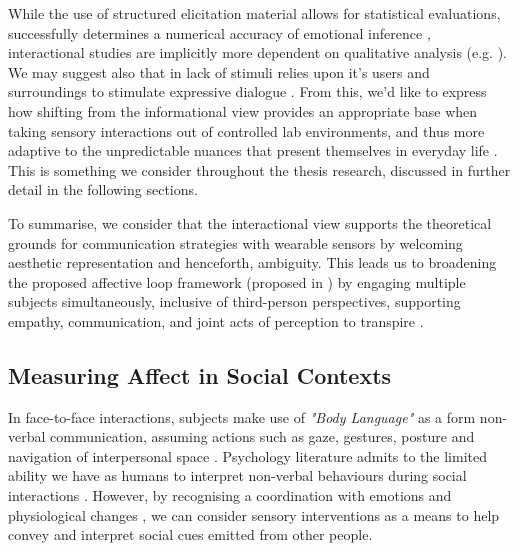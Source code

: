 While the use of structured elicitation material allows for statistical evaluations, successfully determines a numerical accuracy of emotional inference \cite{bota_review_2019}, interactional studies are implicitly more dependent on qualitative analysis (e.g. \cite{hook_embracing_2018,howell_life-affirming_2019}). We may suggest also that in lack of stimuli relies upon it’s users and surroundings to stimulate expressive dialogue \cite{gonzalez_dance-inspired_2012}. From this, we'd like to express how shifting from the informational view provides an appropriate base when taking sensory interactions out of controlled lab environments, and thus more adaptive to the unpredictable nuances that present themselves in everyday life \cite{brown_into_2011,stjerna_aspects_2013,maki-petaja_aesthetic_2014}. This is something we consider throughout the thesis research, discussed in further detail in the following sections.


To summarise, we consider that the interactional view supports the theoretical grounds for communication strategies with wearable sensors by welcoming aesthetic representation and henceforth, ambiguity. This leads us to broadening the proposed affective loop framework (proposed in \cite{hook_affective_2009}) by engaging multiple subjects simultaneously, inclusive of third-person perspectives, supporting empathy, communication, and joint acts of perception to transpire \cite{turmo_vidal_designing_2021,francoise_designing_2017}.

\subsection{Measuring Affect in Social Contexts}
\label{lit_reivew:ssp}
In face-to-face interactions, subjects make use of \textit{"Body Language"} as a form non-verbal communication, assuming actions such as gaze, gestures, posture and navigation of interpersonal space \cite{dobre_immersive_2022}. Psychology literature admits to the limited ability we have as humans to interpret non-verbal behaviours during social interactions \cite{joseph_emotional_2010}. However, by recognising a coordination with emotions and physiological changes \cite{mayer_human_2008}, we can consider sensory interventions as a means to help convey and interpret social cues emitted from other people.

